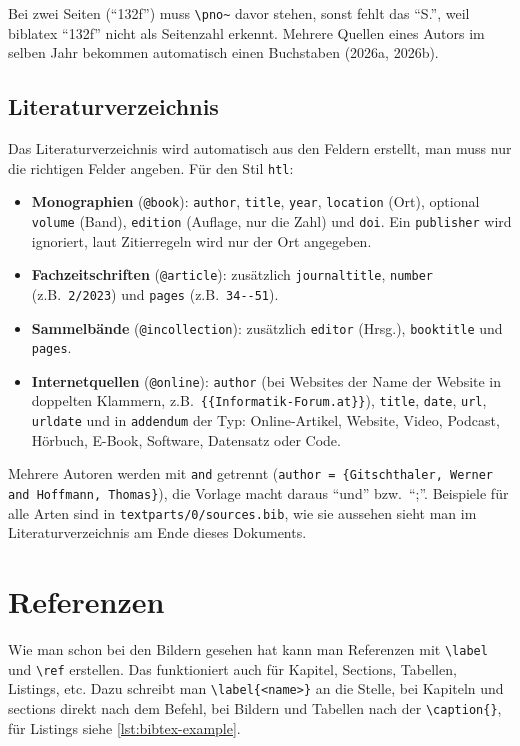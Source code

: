 Bei zwei Seiten (\enquote{132f}) muss \verb|\pno~| davor stehen, sonst fehlt das \enquote{S.}, weil biblatex \enquote{132f} nicht als Seitenzahl erkennt. Mehrere Quellen eines Autors im selben Jahr bekommen automatisch einen Buchstaben (2026a, 2026b).

\subsection{Literaturverzeichnis}

Das Literaturverzeichnis wird automatisch aus den Feldern erstellt, man muss nur die richtigen Felder angeben. Für den Stil \texttt{htl}:

\begin{itemize}
    \item \textbf{Monographien} (\verb|@book|): \verb|author|, \verb|title|, \verb|year|, \verb|location| (Ort), optional \verb|volume| (Band), \verb|edition| (Auflage, nur die Zahl) und \verb|doi|. Ein \verb|publisher| wird ignoriert, laut Zitierregeln wird nur der Ort angegeben.
    \item \textbf{Fachzeitschriften} (\verb|@article|): zusätzlich \verb|journaltitle|, \verb|number| (z.B.\ \verb|2/2023|) und \verb|pages| (z.B.\ \verb|34--51|).
    \item \textbf{Sammelbände} (\verb|@incollection|): zusätzlich \verb|editor| (Hrsg.), \verb|booktitle| und \verb|pages|.
    \item \textbf{Internetquellen} (\verb|@online|): \verb|author| (bei Websites der Name der Website in doppelten Klammern, z.B.\ \verb|{{Informatik-Forum.at}}|), \verb|title|, \verb|date|, \verb|url|, \verb|urldate| und in \verb|addendum| der Typ: Online-Artikel, Website, Video, Podcast, Hörbuch, E-Book, Software, Datensatz oder Code.
\end{itemize}

Mehrere Autoren werden mit \verb|and| getrennt (\verb|author = {Gitschthaler, Werner and Hoffmann, Thomas}|), die Vorlage macht daraus \enquote{und} bzw.\ \enquote{;}. Beispiele für alle Arten sind in \verb|textparts/0/sources.bib|, wie sie aussehen sieht man im Literaturverzeichnis am Ende dieses Dokuments.

\section{Referenzen}

Wie man schon bei den Bildern gesehen hat kann man Referenzen mit \verb|\label| und \verb|\ref| erstellen. Das funktioniert auch für Kapitel, Sections, Tabellen, Listings, etc. Dazu schreibt man \verb|\label{<name>}| an die Stelle, bei Kapiteln und sections direkt nach dem Befehl, bei Bildern und Tabellen nach der \verb|\caption{}|, für Listings siehe \autoref{lst:bibtex-example}.

